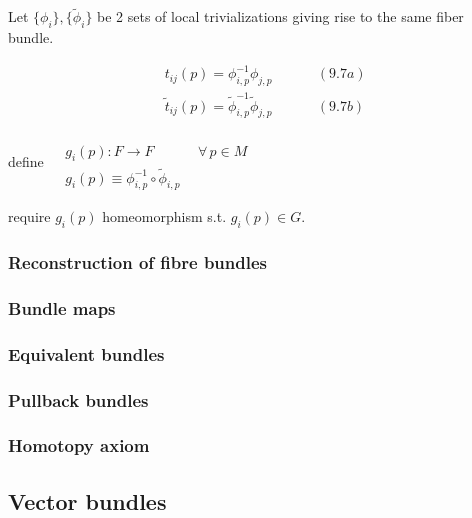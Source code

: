 \documentclass[twoside]{amsart}
\begin{document}
Let $\lbrace \phi_i \rbrace, \lbrace \widetilde{\phi}_i \rbrace$ be 2 sets of local trivializations giving rise to the same fiber bundle.  

\[
\begin{aligned}
  & t_{ij}(p) = \phi^{-1}_{i,p} \phi_{j,p}  \quad \quad \quad \, (9.7a) \\ 
  & \widetilde{t}_{ij}(p) = \widetilde{\phi}^{-1}_{i,p} \widetilde{\phi}_{j,p} \quad \quad \quad \, (9.7b)
\end{aligned}
\]

define $\begin{aligned} & \quad \quad \\ 
  & g_i(p) : F \to F \quad \quad \quad \, \forall \, p \in M \\ 
  & g_i(p) \equiv \phi^{-1}_{i,p} \circ \widetilde{\phi}_{i,p} \end{aligned}$

require $g_i(p)$ homeomorphism s.t. $g_i(p) \in G$.  



\subsubsection{ Reconstruction of fibre bundles }


\subsubsection{ Bundle maps }


\subsubsection{ Equivalent bundles }


\subsubsection{ Pullback bundles }



\subsubsection{ Homotopy axiom }





\subsection{ Vector bundles }
\end{document}
